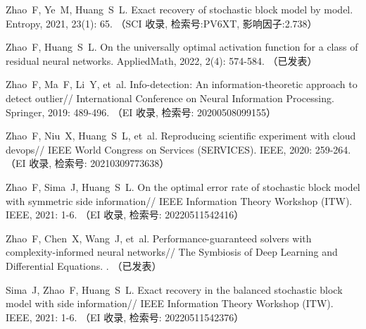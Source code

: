 \begin{resume}
  \begin{achievements}
    \item Zhao~F, Ye~M, Huang~S~L.
    \newblock Exact recovery of stochastic block model by 
      model\allowbreak[J].
    \newblock Entropy, 2021{}, 23\allowbreak (1): 65.
    （SCI 收录, 检索号:PV6XT, 影响因子:2.738）
    \item Zhao~F, Huang~S~L.
    \newblock On the universally optimal activation function for a class of
      residual neural networks\allowbreak[J].
      \newblock AppliedMath, 2022, 2\allowbreak (4): 574-584.
      （已发表）
      \item Zhao~F, Ma~F, Li~Y, et~al.
    \newblock Info-detection: An information-theoretic approach to detect
      outlier\allowbreak[C]//\allowbreak
    International Conference on Neural Information Processing.
    \newblock Springer, 2019: 489-496.
    （EI 收录, 检索号: 20200508099155）
    \item Zhao~F, Niu~X, Huang~S~L, et~al.
    \newblock Reproducing scientific experiment with cloud
      devops\allowbreak[C]// IEEE World Congress on Services (SERVICES).
    \newblock IEEE, 2020: 259-264.
    （EI 收录, 检索号: 20210309773638）
    \item Zhao~F, Sima~J, Huang~S~L.
    \newblock On the optimal error rate of stochastic block model with symmetric
      side information\allowbreak[C]// IEEE Information Theory Workshop (ITW).
    \newblock IEEE, 2021{}: 1-6.
    （EI 收录, 检索号: 20220511542416）
    \item Zhao~F, Chen~X, Wang~J, et~al.
    \newblock Performance-guaranteed  solvers with complexity-informed neural
      networks\allowbreak[C]//\allowbreak
    The Symbiosis of Deep Learning and Differential Equations.
    .
    （已发表）
    \item Sima~J, Zhao~F, Huang~S~L.
    \newblock Exact recovery in the balanced stochastic block model with side
      information\allowbreak[C]// IEEE Information Theory Workshop (ITW).
    \newblock IEEE, 2021: 1-6.
    （EI 收录, 检索号: 20220511542376）
  \end{achievements}




\end{resume}

